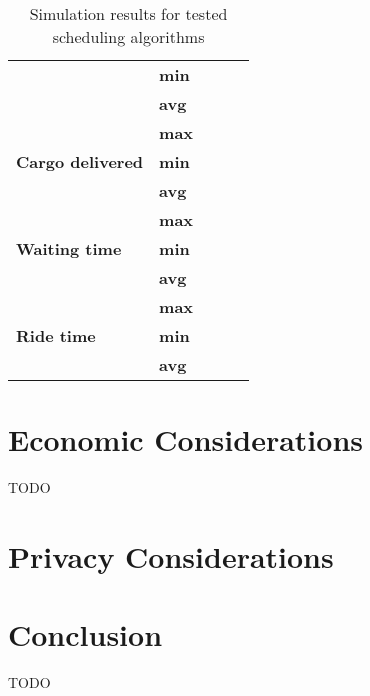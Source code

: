 \begin{table}[]
\begin{tabular}{llrrr}
                                               & \textbf{min} &                   &                    &                  \\
                                               & \textbf{avg} &                   &                    &                  \\
\hline                                               
\multirow{3}{*}{\textbf{Cargo delivered}}      & \textbf{max} &                   &                    &                  \\
                                               & \textbf{min} &                   &                    &                  \\
                                               & \textbf{avg} &                   &                    &                  \\
\hline                                               
\multirow{3}{*}{\textbf{Waiting time}}         & \textbf{max} &                   &                    &                  \\
                                               & \textbf{min} &                   &                    &                  \\
                                               & \textbf{avg} &                   &                    &                  \\
\hline
\multirow{3}{*}{\textbf{Ride time}}            & \textbf{max} &                   &                    &                  \\
                                               & \textbf{min} &                   &                    &                  \\
                                               & \textbf{avg} &                   &                    &                                 
\end{tabular}
\caption{\label{tab:impl:simulationresults} Simulation results for tested scheduling algorithms}
\end{table}

\section{Economic Considerations}
TODO

\section{Privacy Considerations}

\section{Conclusion}
TODO